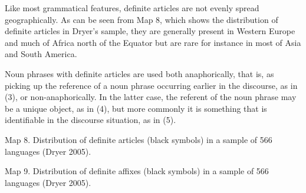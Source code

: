 Like most grammatical features, definite articles are not evenly spread geographically. As can be seen from Map 8, which shows the distribution of definite articles in Dryer’s sample, they are generally present in Western Europe and much of Africa north of the Equator but are rare for instance in most of Asia and South America.

Noun phrases with definite articles are used both anaphorically, that is, as picking up the reference of a noun phrase occurring earlier in the discourse, as in (3), or non-anaphorically. In the latter case, the referent of the noun phrase may be a unique object, as in (4), but more commonly it is something that is identifiable in the discourse situation, as in (5).

\clearpage%
\label{bkm:Ref130721880}Map 8. Distribution of definite articles (black symbols) in a sample of 566 languages (Dryer 2005).


Map 9. Distribution of definite affixes (black symbols) in a sample of 566 languages (Dryer 2005).


